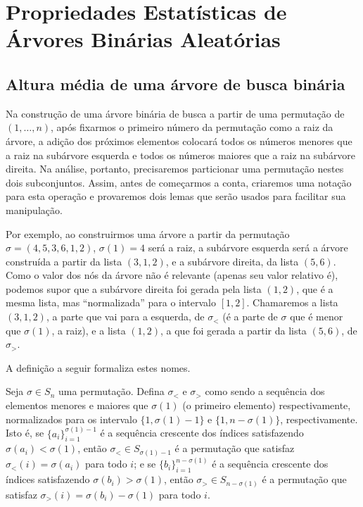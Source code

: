 \section{Propriedades Estatísticas de Árvores Binárias Aleatórias}

\subsection{Altura média de uma árvore de busca binária}

Na construção de uma árvore binária de busca
a partir de uma permutação de $(1, \dots, n)$,
após fixarmos o primeiro número da permutação como a raiz da árvore,
a adição dos próximos elementos colocará
todos os números menores que a raiz na subárvore esquerda
e todos os números maiores que a raiz na subárvore direita.
Na análise, portanto,
precisaremos particionar uma permutação nestes dois subconjuntos.
Assim,
antes de começarmos a conta,
criaremos uma notação para esta operação
e provaremos dois lemas que serão usados para facilitar sua manipulação.

Por exemplo, ao construirmos uma árvore
a partir da permutação $\sigma = (4, 5, 3, 6, 1, 2)$,
$\sigma(1) = 4$ será a raiz,
a subárvore esquerda será a árvore construída a partir da lista $(3, 1, 2)$,
e a subárvore direita, da lista $(5, 6)$.
Como o valor dos nós da árvore não é relevante (apenas seu valor relativo é),
podemos supor que a subárvore direita foi gerada pela lista $(1, 2)$,
que é a mesma lista,
mas ``normalizada'' para o intervalo $[1, 2]$.
Chamaremos a lista $(3, 1, 2)$,
a parte que vai para a esquerda, de $\sigma_<$
(é a parte de $\sigma$ que é menor que $\sigma(1)$, a raiz),
e a lista $(1, 2)$,
a que foi gerada a partir da lista $(5, 6)$, de $\sigma_>$.

A definição a seguir formaliza estes nomes.

\begin{definition}
    Seja $\sigma \in S_n$ uma permutação.
    Defina $\sigma_<$ e $\sigma_>$
    como sendo a sequência dos elementos menores e maiores que $\sigma(1)$
    (o primeiro elemento)
    respectivamente,
    normalizados para os intervalo $\{1, \sigma(1) - 1\}$ e $\{1, n - \sigma(1)\}$,
    respectivamente.
    Isto é,
    se $\{a_i\}_{i = 1}^{\sigma(1)-1}$ é a sequência crescente
    dos índices satisfazendo $\sigma(a_i) < \sigma(1)$,
    então $\sigma_< \in S_{\sigma(1) - 1}$
    é a permutação que satisfaz $\sigma_<(i) = \sigma(a_i)$ para todo $i$;
    e se $\{b_i\}_{i = 1}^{n - \sigma(1)}$ é a sequência crescente
    dos índices satisfazendo $\sigma(b_i) > \sigma(1)$,
    então $\sigma_> \in S_{n - \sigma(1)}$
    é a permutação que satisfaz $\sigma_>(i) = \sigma(b_i) - \sigma(1)$ para todo $i$.
\end{definition}

